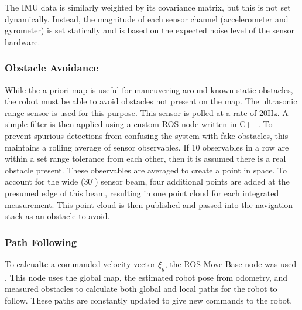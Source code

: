 The IMU data is similarly weighted by its covariance matrix, but this is not set dynamically. Instead, the magnitude of each sensor channel (accelerometer and gyrometer) is set statically and is based on the expected noise level of the sensor hardware. 

\subsubsection{ Obstacle Avoidance }

While the a priori map is useful for maneuvering around known static obstacles, the robot must be able to avoid obstacles not present on the map. The ultrasonic range sensor is used for this purpose. This sensor is polled at a rate of 20Hz. A simple filter is then applied using a custom ROS node written in C++. To prevent spurious detections from confusing the system with fake obstacles, this maintains a rolling average of sensor observables. If 10 observables in a row are within a set range tolerance from each other, then it is assumed there is a real obstacle present. These observables are averaged to create a point in space. To account for the wide ($30^{\circ}$) sensor beam, four additional points are added at the presumed edge of this beam, resulting in one point cloud for each integrated measurement. This point cloud is then published and passed into the navigation stack as an obstacle to avoid. 

\subsubsection{ Path Following }

To calcualte a commanded velocity vector $\xi_g$, the ROS Move Base node was used \cite{movebase}. This node uses the global map, the estimated robot pose from odometry, and measured obstacles to calculate both global and local paths for the robot to follow. These paths are constantly updated to give new commands to the robot. 

